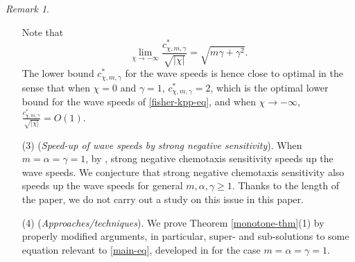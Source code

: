 \documentclass[11pt]{article} %
\theoremstyle{remark}
\newtheorem{remark}{Remark}[section]
\theoremstyle{remark}
\numberwithin{equation}{section}
\numberwithin{figure}{section}
\numberwithin{table}{section}
\begin{document}
\begin{remark}
\begin{itemize}
Note that
\begin{equation}
\label{speed-limit-eq}
\lim_{\chi \to -\infty}\frac{c^*_{\chi,m,\gamma}}{\sqrt {|\chi|}}=\sqrt {m\gamma +\gamma^2}.
\end{equation}
The lower bound $c^*_{\chi,m,\gamma}$ for the wave speeds  is hence  close to optimal in the sense that 
when $\chi=0$ and $\gamma=1$, $c^*_{\chi,m,\gamma}=2$,
which is the optimal lower bound for the wave speeds of \eqref{fisher-kpp-eq}, and when $\chi\to -\infty$, 
$\frac{c^*_{\chi,m,\gamma}}{\sqrt{|\chi|}}=O(1)$.

\item[(3)]({\it Speed-up of wave speeds by strong negative sensitivity}). When $m=\alpha=\gamma=1$, by \cite[Theorem 2.1]{GrHeTu2023}, strong negative chemotaxis sensitivity speeds up the wave speeds. We conjecture that 
strong negative chemotaxis sensitivity  also speeds up the wave speeds for general $m,\alpha,\gamma\ge 1$. 
Thanks to the length of the paper, we do not carry out a study on this issue in this paper.

\item[(4)] ({\it Approaches/techniques}). We   prove  Theorem \ref{monotone-thm}(1) by properly modified arguments, in particular,  super- and sub-solutions to some equation relevant to \eqref{main-eq},    developed in  \cite{SaSh2017-1, SaSh2020, SaShXu2019} for the case $m=\alpha=\gamma=1$.
\end{itemize}
\end{remark}
\end{document}

